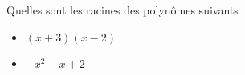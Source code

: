 \bexo
Quelles sont les racines des polynômes suivants
\begin{itemize}
	\item $(x+3)(x-2)$
	\item $-x^2-x+2$
\end{itemize}
	\ifsolutions \else 
\vspace*{4cm}
\fi 
\eexo
{}
